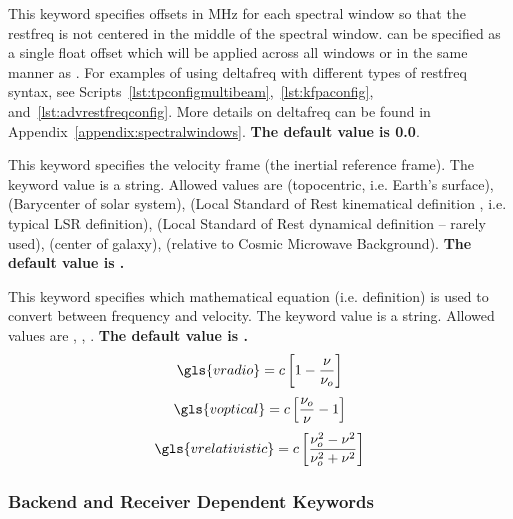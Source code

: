 \begin{description}[font=\bfseries\large,leftmargin=*,align=right]
\item[deltafreq] This keyword specifies offsets in MHz for each spectral
window so that the restfreq is not centered in the middle of the spectral
window.  can be specified as a single float offset which
will be applied across all windows or in the same manner as .
For examples of using deltafreq with different types of restfreq syntax, see
Scripts~\ref{lst:tpconfigmultibeam},~\ref{lst:kfpaconfig},
and~\ref{lst:advrestfreqconfig}.  More details on deltafreq can be found in
Appendix~\ref{appendix:spectralwindows}.  {\bf The default value is 0.0}.


\item[vframe]  This keyword specifies the velocity frame (the inertial
reference frame).  The keyword value is a string.  Allowed values
are  (topocentric, i.e. Earth's surface), 
(Barycenter of solar system),  (Local Standard of Rest kinematical
definition , i.e. typical LSR definition),  (Local Standard of Rest 
dynamical definition -- rarely used),  (center of galaxy),  
(relative to Cosmic Microwave Background).
{\bf The default value is .}

\item[{\bf \large vdef}] This keyword specifies which mathematical equation
(i.e. definition) is used to convert between frequency and velocity.  The
keyword value is a string.  Allowed values are , ,
. {\bf The default value is .}
\begin{equation}
\gls{vradio} = c \left[ 1 - {\nu \over \nu_o} \right]
\label{eq:vradio}
\end{equation}
\begin{equation}
\gls{voptical} = c \left[ {\nu_o \over \nu} - 1\right]
\label{eq:voptical}
\end{equation}
\begin{equation}
\gls{vrelativistic} = c \left[ {\nu_o^2 - \nu^2 \over \nu_o^2 + \nu^2} \right]
\label{eq:vrel}
\end{equation}
 

\end{description}


\subsubsection{Backend and Receiver Dependent Keywords}

